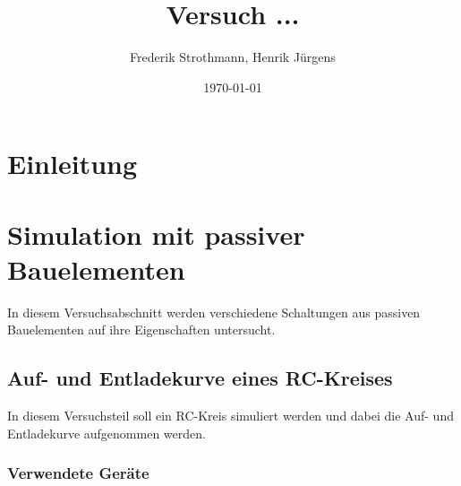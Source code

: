 \documentclass[12pt,a4paper]{article}
\title{Versuch ...\\}
\author{Frederik Strothmann, Henrik Jürgens}
\date{\today}
\begin{document}
\maketitle
\newpage
\tableofcontents
\newpage
\section{Einleitung}

\section{Simulation mit passiver Bauelementen}

In diesem Versuchsabschnitt werden verschiedene Schaltungen aus passiven Bauelementen auf ihre Eigenschaften untersucht.

\subsection{Auf- und Entladekurve eines RC-Kreises}

In diesem Versuchsteil soll ein RC-Kreis simuliert werden und dabei die Auf- und Entladekurve aufgenommen werden.

\subsubsection{Verwendete Geräte}
\end{document}
